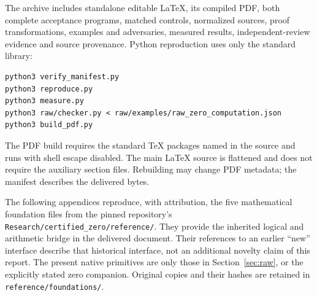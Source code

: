 The archive includes standalone editable LaTeX, its compiled PDF, both
complete acceptance programs, matched controls, normalized sources,
proof transformations, examples and adversaries, measured results,
independent-review evidence and source provenance. Python reproduction
uses only the standard library:
\begin{lstlisting}[language={}]
python3 verify_manifest.py
python3 reproduce.py
python3 measure.py
python3 raw/checker.py < raw/examples/raw_zero_computation.json
python3 build_pdf.py
\end{lstlisting}
The PDF build requires the standard TeX packages named in the source and
runs with shell escape disabled. The main LaTeX source is flattened and
does not require the auxiliary section files. Rebuilding may change PDF
metadata; the manifest describes the delivered bytes.

The following appendices reproduce, with attribution, the five mathematical
foundation files from the pinned repository's
\texttt{Research/certified\_zero/reference/}. They provide the inherited
logical and arithmetic bridge in the delivered document. Their references
to an earlier ``new'' interface describe that historical interface, not
an additional novelty claim of this report. The present native primitives
are only those in Section~\ref{sec:raw}, or the explicitly stated zero
companion. Original copies and their hashes are retained in
\texttt{reference/foundations/}.

